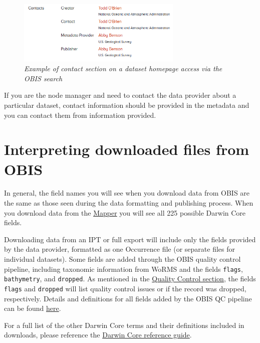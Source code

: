 \documentclass[
  letterpaper,
  DIV=11,
  numbers=noendperiod,
  oneside]{scrreprt}
\begin{document}
\begin{figure}

{\centering \includegraphics[width=0.7\textwidth,height=\textheight]{images/contact-dataprovider.png}

}

\caption{\emph{Example of contact section on a dataset homepage access
via the OBIS search}}

\end{figure}

If you are the node manager and need to contact the data provider about
a particular dataset, contact information should be provided in the
metadata and you can contact them from information provided.

\hypertarget{interpreting-downloaded-files-from-obis}{%
\section{Interpreting downloaded files from
OBIS}\label{interpreting-downloaded-files-from-obis}}

In general, the field names you will see when you download data from
OBIS are the same as those seen during the data formatting and
publishing process. When you download data from the
\href{https://mapper.obis.org/}{Mapper} you will see all 225 possible
Darwin Core fields.

Downloading data from an IPT or full export will include only the fields
provided by the data provider, formatted as one Occurrence file (or
separate files for individual datasets). Some fields are added through
the OBIS quality control pipeline, including taxonomic information from
WoRMS and the fields \texttt{flags}, \texttt{bathymetry}, and
\texttt{dropped}. As mentioned in the \href{dataquality.html}{Quality
Control section}, the fields \texttt{flags} and \texttt{dropped} will
list quality control issues or if the record was dropped, respectively.
Details and definitions for all fields added by the OBIS QC pipeline can
be found \href{https://obis.org/data/access/}{here}.

For a full list of the other Darwin Core terms and their definitions
included in downloads, please reference the
\href{https://dwc.tdwg.org/terms/}{Darwin Core reference guide}.
\end{document}
